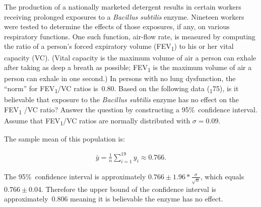 \begin{problem}
   The production of a nationally marketed detergent results in certain workers receiving prolonged exposures to a \textit{Bacillus subtilis} enzyme. Nineteen workers were tested to determine the effects of those exposures, if any, on various respiratory functions. One such function, air-flow rate, is measured by computing the ratio of a person’s forced expiratory volume (FEV\textsubscript{1}) to his or her vital capacity (VC). (Vital capacity is the maximum volume of air a person can exhale after taking as deep a breath as possible; FEV\textsubscript{1} is the maximum volume of air a person can exhale in one second.) In persons with no lung dysfunction, the “norm” for FEV\textsubscript{1}/VC ratios is~0.80. Based on the following data (\textsubscript{1}75), is it believable that exposure to the \textit{Bacillus subtilis} enzyme has no effect on the FEV\textsubscript{1} /VC ratio? Answer the question by constructing a 95\%~confidence interval. Assume that FEV\textsubscript{1}/VC ratios are normally distributed with ${\sigma = 0.09}$.
\end{problem}

The sample mean of this population is:

\begin{align*}
  \bar{y} = \frac{1}{n} \sum_{i=1}^{19}y_i \approx 0.766 \text{.}
\end{align*}

The 95\%~confidence interval is approximately ${0.766 \pm 1.96 * \frac{\sigma}{\sqrt{n}}}$, which equals ${0.766 \pm 0.04}$.  Therefore the upper bound of the confidence interval is approximately~0.806 meaning it is believable the enzyme has no effect.
